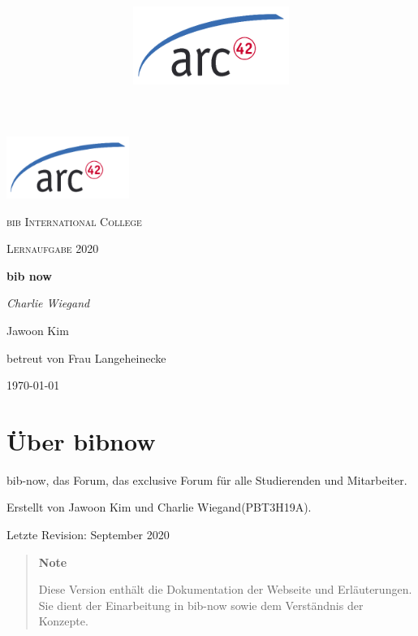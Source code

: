 \documentclass[]{article}
\title{\includegraphics{images/arc42-logo.png}}
\begin{document}
\begin{titlepage}
	\section{}
	\centering
	\includegraphics[width=0.3\textwidth]{images/arc42-logo.png}\par\vspace{1cm}
	{\scshape\LARGE bib International College\par}
	\vspace{1cm}
	{\rmfamily\scshape Lernaufgabe 2020\par}
	\vspace{1.5cm}
	{\Huge\bfseries bib now\par}
	\vspace{2cm}
	{\Large\itshape Charlie Wiegand\par Jawoon Kim\par}
	\vfill
	betreut von Frau Langeheinecke\par
	\vfill
	{\large \today\par}
\end{titlepage}

\maketitle

\vspace{2cm}

\section{Über bibnow}
bib-now, das Forum, das exclusive Forum für alle Studierenden und Mitarbeiter.

\vspace{1cm}

Erstellt von Jawoon Kim und Charlie Wiegand(PBT3H19A).

Letzte Revision: September 2020

\vspace{2cm}

\begin{quote}
\textbf{Note}

Diese Version enthält die Dokumentation der Webseite und Erläuterungen. Sie dient
der Einarbeitung in bib-now sowie dem Verständnis der Konzepte. 
\end{quote}
\end{document}
